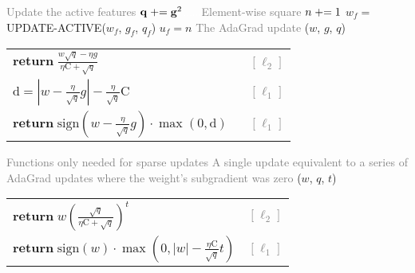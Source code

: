 \begin{algorithm}
\begin{multicols}{2}
\begin{algorithmic}[]
            \State \textcolor{gray}{Update the active features}
            \State $\mathbf{q} \mathrel{+}= \mathbf{g}^2$\textcolor{white}{......}\textcolor{gray}{Element-wise square}
            \State $n \mathrel{+}= 1$
                \State $w_f =$ {\footnotesize UPDATE-ACTIVE}($w_f$, $g_f$, $q_f$)
                \State $u_f = n$
    \EndMyFor
    \EndMyFor
    \EndMyFor
    \columnbreak
    \State \textcolor{gray}{The AdaGrad update}
    ($w$, $g$, $q$) \\
        \hspace{4mm}\begin{tabular}{ll}
            $\mathbf{return} \; \frac{w \sqrt{q} - \eta g}{\eta \mathrm{C} + \sqrt{q}}$
            & \textcolor{gray}{$\;\;\,[\ell_2]$} \\
            $\mathrm{d} = |w - \frac{\eta}{\sqrt{q}} g| - \frac{\eta}{\sqrt{q}} \mathrm{C}$
            & \textcolor{gray}{$\;\;\,[\ell_1]$} \\
            $\mathbf{return} \; \mathrm{sign}(w - \frac{\eta}{\sqrt{q}} g) \cdot \max(0, \mathrm{d})$
            & \textcolor{gray}{$\;\;\,[\ell_1]$} \\
        \end{tabular}
    \EndMyFunction
    \vspace{1mm}
    \begin{lefttopbot}[style=mdftight]
    \vspace{-1mm}
    \State \textcolor{gray}{Functions only needed for sparse updates}
    \vspace{1mm}
    \State \textcolor{gray}{A single update equivalent to a series of AdaGrad updates where the weight's subgradient was zero}
    ($w$, $q$, $t$) \\
        \vspace{1mm}\hspace{4mm}\begin{tabular}{ll}
            $\mathbf{return} \; w \left(\frac{\sqrt{q}}{\eta \mathrm{C} + \sqrt{q}}\right)^{t}$
            & \textcolor{gray}{$[\ell_2]$} \\
            $\mathbf{return} \; \mathrm{sign}(w) \cdot \max(0, |w| - \frac{\eta \mathrm{C}}{\sqrt{q}} t)$
            & \textcolor{gray}{$[\ell_1]$} \\
        \end{tabular}
    \EndMyFunction
    \vspace{-1mm}

\end{lefttopbot}
\end{algorithmic}
\end{multicols}
\end{algorithm}
